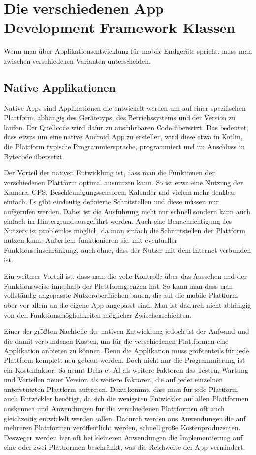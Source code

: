 \section{Die verschiedenen App Development Framework Klassen}
Wenn man über Applikationsentwicklung für mobile Endgeräte spricht, muss man zwischen verschiedenen Varianten unterscheiden.
\subsection{Native Applikationen}
Native Apps sind Applikationen die entwickelt werden um auf einer spezifischen Plattform, abhängig des Gerätetyps, des Betriebssystems und der Version zu laufen. Der Quellcode wird dafür zu ausführbaren Code übersetzt.\cite{IEEE_development_classes}
Das bedeutet, dass etwas um eine native Android App zu erstellen, wird diese etwa in Kotlin, die Plattform typische Programmiersprache, programmiert und im Anschluss in Bytecode übersetzt.

Der Vorteil der nativen Entwicklung ist, dass man die Funktionen der verschiedenen Plattform optimal ausnutzen kann. So ist etwa eine Nutzung der Kamera, GPS, Beschleunigungssensoren, Kalender und vielem mehr denkbar einfach. Es gibt eindeutig definierte Schnitstellen und diese müssen nur aufgerufen werden. Dabei ist die Ausführung nicht nur schnell sondern kann auch einfach im Hintergrund ausgeführt werden. Auch eine Benachrichtigung des Nutzers ist problemlos möglich, da man einfach die Schnittstellen der Plattform nutzen kann. Außerdem funktionieren sie, mit eventueller Funktionseinschränkung, auch ohne, dass der Nutzer mit dem Internet verbunden ist. \cite{IEEE_development_classes}

Ein weiterer Vorteil ist, dass man die volle Kontrolle über das Aussehen und der Funktionsweise innerhalb der Plattformgrenzen hat. So kann man dass man vollständig angepasste Nutzeroberflächen bauen, die auf die mobile Plattform aber vor allem an die eigene App angepasst sind. Man ist dadurch nicht abhängig von den Funktionsmöglichkeiten möglicher Zwischenschichten.

Einer der größten Nachteile der nativen Entwicklung jedoch ist der Aufwand und die damit verbundenen Kosten, um für die verschiedenen Plattformen eine Applikation anbieten zu können. Denn die Applikation muss größtenteils für jede Plattform komplett neu gebaut werden. Doch nicht nur die Programmierung ist ein Kostenfaktor. So nennt Delia et Al als weitere Faktoren das Testen, Wartung und Verteilen neuer Version als weitere Faktoren, die auf jeder einzelnen unterstützten Plattform auftreten.\cite{IEEE_development_classes} Dazu kommt, dass man für jede Plattform auch Entwickler benötigt, da sich die wenigsten Entwickler auf allen Plattformen auskennen und Anwendungen für die verschiedenen Plattformen oft auch gleichzeitig entwickelt werden sollen. Dadurch werden aus Anwendungen die auf mehreren Plattformen veröffentlicht werden, schnell große Kostenproduzenten. Deswegen werden hier oft bei kleineren Anwendungen die Implementierung auf eine oder zwei Plattformen beschränkt, was die Reichweite der App vermindert.

